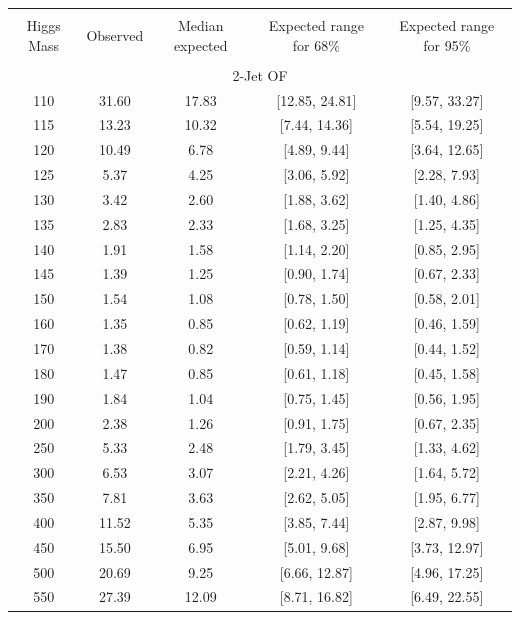 \begin{table}[hbp!]
\begin{center}
\begin{tabular}{c c c c c}
\hline
\vspace{-3mm} && \\
 Higgs Mass & Observed  & Median expected & Expected range for 68\% & Expected range for 95\%   \\
\vspace{-3mm} && \\
\hline
\multicolumn{5}{c}{2-Jet OF} \\
\hline
110 & 31.60 & 17.83 & [12.85, 24.81] & [9.57, 33.27] \\
115 & 13.23 & 10.32 & [7.44, 14.36] & [5.54, 19.25] \\
120 & 10.49 & 6.78 & [4.89, 9.44] & [3.64, 12.65] \\
125 & 5.37 & 4.25 & [3.06, 5.92] & [2.28, 7.93] \\
130 & 3.42 & 2.60 & [1.88, 3.62] & [1.40, 4.86] \\
135 & 2.83 & 2.33 & [1.68, 3.25] & [1.25, 4.35] \\
140 & 1.91 & 1.58 & [1.14, 2.20] & [0.85, 2.95] \\
145 & 1.39 & 1.25 & [0.90, 1.74] & [0.67, 2.33] \\
150 & 1.54 & 1.08 & [0.78, 1.50] & [0.58, 2.01] \\
160 & 1.35 & 0.85 & [0.62, 1.19] & [0.46, 1.59] \\
170 & 1.38 & 0.82 & [0.59, 1.14] & [0.44, 1.52] \\
180 & 1.47 & 0.85 & [0.61, 1.18] & [0.45, 1.58] \\
190 & 1.84 & 1.04 & [0.75, 1.45] & [0.56, 1.95] \\
200 & 2.38 & 1.26 & [0.91, 1.75] & [0.67, 2.35] \\
250 & 5.33 & 2.48 & [1.79, 3.45] & [1.33, 4.62] \\
300 & 6.53 & 3.07 & [2.21, 4.26] & [1.64, 5.72] \\
350 & 7.81 & 3.63 & [2.62, 5.05] & [1.95, 6.77] \\
400 & 11.52 & 5.35 & [3.85, 7.44] & [2.87, 9.98] \\
450 & 15.50 & 6.95 & [5.01, 9.68] & [3.73, 12.97] \\
500 & 20.69 & 9.25 & [6.66, 12.87] & [4.96, 17.25] \\
550 & 27.39 & 12.09 & [8.71, 16.82] & [6.49, 22.55] \\

\end{tabular}
\end{center}
\end{table}
